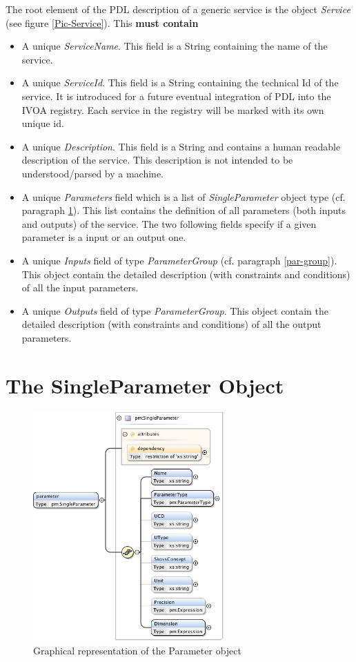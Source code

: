 \documentclass[a4paper,11pt] {ivoa}
\begin{document}
The root element of the PDL description of a generic service is the object {\it Service} (see figure
\ref{Pic-Service}). This {\bf must contain}
\begin{itemize}
\item A unique {\it ServiceName}. This field is a String containing the name of the service.
\item A unique {\it ServiceId}. This field is a String containing the technical Id of the service.
It is introduced for a future eventual integration of PDL into the IVOA registry. Each service in
the registry will be marked with its own unique id.
\item A unique {\it Description}. This field is a String and contains a human readable description
of the service. This description is not intended to be understood/parsed by a machine.
\item A unique {\it Parameters} field which is a list of {\it SingleParameter} object type (cf.
paragraph \ref{par01}). This list contains the definition of all parameters (both inputs and
outputs) of the service. The two following fields specify if a given parameter is a input or an
output one.
\item A unique {\it Inputs} field of type {\it ParameterGroup} (cf. paragraph \ref{par-group}). This
object contain the detailed description (with constraints and conditions) of all the input
parameters.
\item A unique {\it Outputs} field of type {\it ParameterGroup}. This object contain the detailed
description (with constraints and conditions) of all the output parameters.
\end{itemize}


\section{The SingleParameter Object}\label{par01}

\begin{figure}[htbp]
\begin{center}
\includegraphics[width=0.65\textwidth]{pictures/Parameter.jpg} 
\caption{Graphical representation of the Parameter object}
\label{Pic-Parameter}
\end{center}
\end{figure}
\end{document}
